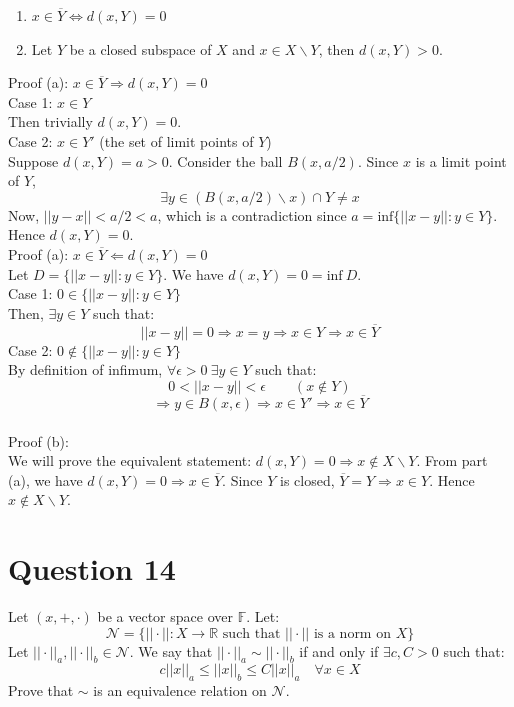 \documentclass{article}
\begin{document}
	\begin{enumerate}[label=(\alph*)]
		\item $x \in \overline{Y} \Leftrightarrow d(x, Y) = 0$
		\item Let $Y$ be a closed subspace of $X$ and $x \in X \backslash Y$, then $d(x, Y) > 0$.
	\end{enumerate}

	Proof (a): $x \in \overline{Y} \Rightarrow d(x, Y) = 0$ \\
	Case 1: $x \in Y$ \\
	Then trivially $d(x, Y) = 0$. \\
	Case 2: $x \in Y'$ (the set of limit points of $Y$) \\
	Suppose $d(x, Y) = a > 0$.
	Consider the ball $B(x, a / 2)$.
	Since $x$ is a limit point of $Y$,
	\[ \exists y \in (B(x, a / 2) \backslash {x}) \cap Y \ne x \]
	Now, $||y - x|| < a / 2 < a$, which is a contradiction since
	$a = \text{inf} \{||x - y||: y \in Y\}$.
	Hence $d(x, Y) = 0$. \\

	Proof (a): $x \in \overline{Y} \Leftarrow d(x, Y) = 0$ \\
	Let $D = \{||x - y||: y \in Y\}$.
	We have $d(x, Y) = 0 = \text{inf} ~ D$. \\
	Case 1: $0 \in \{||x - y||: y \in Y\}$ \\
	Then, $\exists y \in Y$ such that:
	\[ ||x - y|| = 0 \Rightarrow x = y \Rightarrow x \in Y \Rightarrow x \in \overline{Y} \]
	Case 2: $0 \notin \{||x - y||: y \in Y\}$ \\
	By definition of infimum, $\forall \epsilon > 0 ~ \exists y \in Y$ such that:
	\[ 0 < ||x - y|| < \epsilon \qquad (x \notin Y) \]
	\[ \Rightarrow y \in B(x, \epsilon) \Rightarrow x \in Y' \Rightarrow x \in \overline{Y} \] \\

	Proof (b): \\
	We will prove the equivalent statement: $d(x, Y) = 0 \Rightarrow x \notin X \backslash Y$.
	From part (a), we have $d(x, Y) = 0 \Rightarrow x \in \overline{Y}$.
	Since $Y$ is closed, $\overline{Y} = Y \Rightarrow x \in Y$.
	Hence $x \notin X \backslash Y$.

\section{Question 14}

	Let $(x, +, \cdot)$ be a vector space over $\mathbb{F}$.
	Let:
	\[
		\mathcal{N} = \{||\cdot||: X \to \mathbb{R} \text{ such that }
		||\cdot|| \text{ is a norm on } X\}
	\]
	Let $||\cdot||_a, ||\cdot||_b \in \mathcal{N}$.
	We say that $||\cdot||_a \sim ||\cdot||_b$ if and only if $\exists c, C > 0$ such that:
	\[ c ||x||_a \le ||x||_b \le C ||x||_a \quad \forall x \in X \]
	Prove that $\sim$ is an equivalence relation on $\mathcal{N}$. \\
\end{document}
